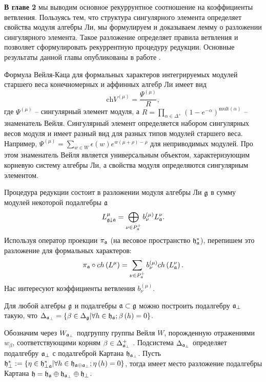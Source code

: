 \documentclass[14pt,autoref,href,facsimile
]{disser}
\begin{document}
\textbf{В главе 2} мы выводим основное рекуррунтное соотношение на коэффициенты ветвления. Пользуясь тем, что структура сингулярного элемента определяет свойства модуля алгебры Ли, мы формулируем и доказываем лемму о разложении сингулярного элемента. Такое разложение определяет правила ветвления и позволяет сформулировать рекуррентную процедуру редукции. Основные результаты данной главы опубликованы в работе . 

Формула Вейля-Каца для формальных характеров интегрируемых модулей старшего веса конечномерных и аффинных алгебр Ли имеет вид
\begin{equation}
  \label{eq:1}
  \mathrm{ch} V^{(\mu)} = \frac{\Psi^{(\mu)}}{R},
\end{equation}
где $\Psi^{(\mu)}$ -- сингулярный элемент модуля, а $R=\prod_{\alpha\in \Delta^+}(1-e^{-\alpha})^{\mathrm{mult}(\alpha)}$ -- знаменатель Вейля. Сингулярный элемент определяется набором сингулярных весов модуля и имеет разный вид для разных типов модулей старшего веса. Например, $\Psi^{(\mu)}=\sum_{w\in W} \epsilon(w) e^{w(\mu+\rho)-\rho}$ для неприводимых модулей. Про этом знаменатель Вейля является универсальным объектом, характеризующим корневую систему алгебры Ли, а свойства модуля определяются сингулярным элементом.

Процедура редукции состоит в разложении модуля алгебры Ли $\mathfrak{g}$ в сумму модулей некоторой подалгебры $\mathfrak{a}$
\begin{equation}
  \label{eq:2}
  L_{\mathfrak{g}\downarrow \mathfrak{a}}^{\mu }=\bigoplus
\limits_{\nu \in P_{\mathfrak{a}}^{+}}b_{\nu }^{\left( \mu \right) }L_{\mathfrak{a}}^{\nu }.
\end{equation}
Используя оператор проекции  $\pi_{\mathfrak{a}}$ (на весовое пространство $\mathfrak{h}_{\mathfrak{a}}^*$), перепишем это разложение для формальных характеров:
\begin{equation}
\label{branching1}
 \pi _{\mathfrak{a}}\circ ch\left( L^{\mu }\right)
 =\sum_{\nu \in P_{\mathfrak{a}}^{+}}b_{\nu }^{(\mu)}ch\left( L_{\mathfrak{a}}^{\nu }\right) .
\end{equation}
Нас интересуют коэффициенты ветвления $b^{(\mu)}_{\nu}$.

Для любой алгебры $\mathfrak{g}$ и подалгебры $\mathfrak{a}\subset \mathfrak{g}$ можно построить  подалгебру $\mathfrak{a}_{\perp}$ такую, что $\Delta _{\mathfrak{a}_{\perp }} =\left\{ \beta \in \Delta _{\mathfrak{g}}| \forall h \in \mathfrak{h}_{\mathfrak{a}};  \beta\left(h \right)=0  \right\}$.

Обозначим через $W_{\mathfrak{a}_{\perp}}$ подгруппу группы Вейля $W$, порожденную отражениями $w _{\beta }$, соответствующими корням $\beta \in \Delta _{\mathfrak{a}_{\perp}}^{+}$ . Подсистема  $\Delta _{\mathfrak{a}_{\perp }}$ определяет подалгебру $\mathfrak{a}_{\perp }$ с подалгеброй Картана $\mathfrak{h}_{\mathfrak{a}_{\perp}}$.  Пусть
$\mathfrak{h}_{\perp }^{\ast }:=\left\{ \eta \in \mathfrak{h}_{\perp \mathfrak{a}}^{\ast
}|\forall h \in \mathfrak{h}_{\mathfrak{a}\oplus \mathfrak{a}_{\perp}}; \eta \left( h \right)=0 \right\}$, тогда имеет место разложение подалгебры Картана $\mathfrak{h}=\frak{\mathfrak{h}_{\mathfrak{a}}}\oplus \mathfrak{h}_{\mathfrak{a}_{\perp}}\oplus\mathfrak{h}_{\perp }$.
\end{document}
